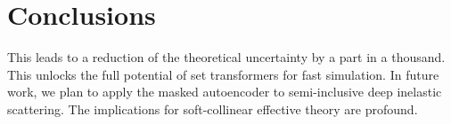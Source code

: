 \section{Conclusions}\label{sec:conclusions}

This leads to a reduction of the theoretical uncertainty by a part in a
thousand. This unlocks the full potential of set transformers for fast
simulation. In future work, we plan to apply the masked autoencoder to
semi-inclusive deep inelastic scattering. The implications for
soft-collinear effective theory are profound.

